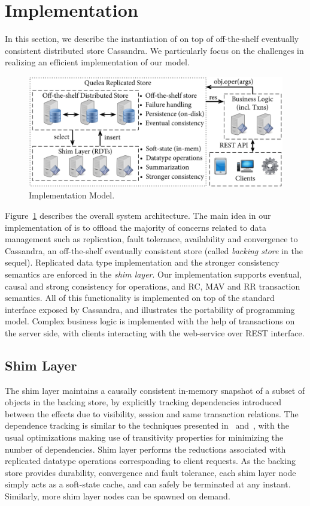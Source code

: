 \section{Implementation}

In this section, we describe the instantiation of \name on top of off-the-shelf
eventually consistent distributed store Cassandra. We particularly focus on the
challenges in realizing an efficient implementation of our model.

\begin{figure}
\begin{center}
\includegraphics[width=0.9\columnwidth]{Figures/ImplModel}
\end{center}
\caption{Implementation Model.}
\label{fig:impl_mod}
\end{figure}

Figure~\ref{fig:impl_mod} describes the overall system architecture. The main
idea in our implementation of \name is to offload the majority of concerns
related to data management such as replication, fault tolerance, availability
and convergence to Cassandra, an off-the-shelf eventually consistent store
(called \emph{backing store} in the sequel). Replicated data type
implementation and the stronger consistency semantics are enforced in the
\emph{shim layer}. Our implementation supports eventual, causal and strong
consistency for operations, and RC, MAV and RR transaction semantics. All of
this functionality is implemented on top of the standard interface exposed by
Cassandra, and illustrates the portability of \name programming model. Complex
business logic is implemented with the help of transactions on the server side,
with clients interacting with the web-service over REST interface.

\subsection{Shim Layer}

The shim layer maintains a causally consistent in-memory snapshot of a subset
of objects in the backing store, by explicitly tracking dependencies introduced
between the effects due to visibility, session and same transaction relations.
The dependence tracking is similar to the techniques presented in~\cite{BoltOn}
and~\cite{Eiger}, with the usual optimizations making use of transitivity
properties for minimizing the number of dependencies. Shim layer performs the
reductions associated with replicated datatype operations corresponding to
client requests. As the backing store provides durability, convergence and
fault tolerance, each shim layer node simply acts as a soft-state cache, and
can safely be terminated at any instant. Similarly, more shim layer nodes can
be spawned on demand.

